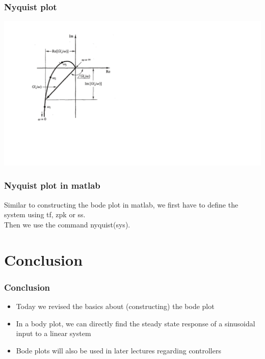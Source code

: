 \begin{frame}
\frametitle{Nyquist plot}

\includegraphics[scale=0.5]{NyquistPlot}

\end{frame}

\begin{frame}
\frametitle{Nyquist plot in matlab}
Similar to constructing the bode plot in matlab, we first have to define the system using tf, zpk or ss.\\
Then we use the command nyquist(sys).


\end{frame}

\section{Conclusion}

\begin{frame}
\frametitle{Conclusion}

\begin{itemize}
\item Today we revised the basics about (constructing) the bode plot
\item In a body plot, we can directly find the steady state response of a sinusoidal input to a linear system
\item Bode plots will also be used in later lectures regarding controllers

\end{itemize}

\end{frame}


